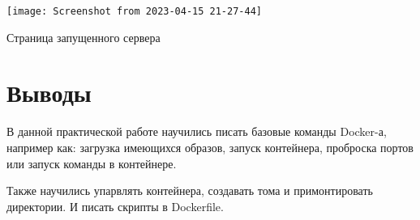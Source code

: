 \begin{image}
	\texttt{[image: Screenshot from 2023-04-15 21-27-44]}
	\caption{Страница запущенного сервера}
	\label{fig:indvar:page}
\end{image}

\clearpage

\section*{\LARGE Выводы}
В данной практической работе научились писать базовые команды Docker-а,
например как: загрузка имеющихся образов, запуск контейнера, проброска
портов или запуск команды в контейнере.\par
Также научились упарвлять контейнера, создавать тома и примонтировать
директории. И писать скрипты в Dockerfile.

